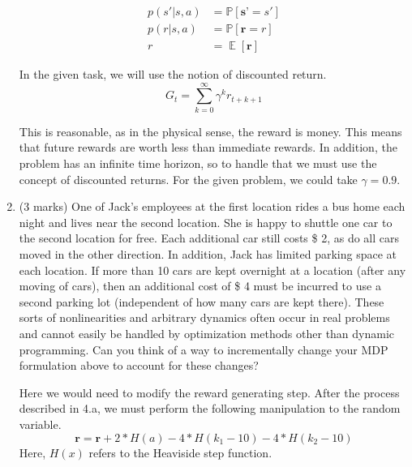 \documentclass[addpoints,12pt,solution]{exam}
\DeclareMathOperator{\E}{\mathbb{E}}
\begin{document}
\begin{questions}
\begin{enumerate}[label=(\alph*)]
\begin{solution}
                \begin{align*}
                    p(s'| s, a) &= \mathbb{P}[\textbf{s'} = s'] \\
                    p(r| s, a) &= \mathbb{P}[\textbf{r} =r ] \\
                    r &= \E[\textbf{r}]
                \end{align*}

                In the given task, we will use the notion of discounted return.
                \[
                    G_t = \sum_{k=0}^{\infty}\gamma^k r_{t+k+1}
                \]

                This is reasonable, as in the physical sense, the reward is money.
                This means that future rewards are worth less than immediate rewards.
                In addition, the problem has an infinite time horizon, so to handle that we must use the concept of discounted returns.
                For the given problem, we could take $\gamma = 0.9$.


            \end{solution}

            \item (3 marks) One of Jack’s employees at the first location rides a bus home each night and lives near the second location. She is happy to shuttle one car to the second location for free. Each additional car still costs \$ 2, as do all cars moved in the other direction. In addition, Jack has limited parking space at each location. If more than 10 cars are kept overnight at a location (after any moving of cars), then an additional cost of \$ 4 must be incurred to use a second parking lot (independent of how many cars are kept there). These sorts of nonlinearities and arbitrary dynamics often occur in real problems and cannot easily be handled by optimization methods other than
            dynamic programming. Can you think of a way to incrementally change your MDP formulation above to account for these changes?

            \begin{solution}
                Here we would need to modify the reward generating step.
                After the process described in 4.a, we must perform the following manipulation to the random variable.
                \[
                    \textbf{r} = \textbf{r} + 2 * H(a) - 4 * H(k_1 - 10) - 4 * H(k_2 - 10)
                \]
                Here, $H(x)$ refers to the Heaviside step function.
            \end{solution}


\end{enumerate}
\end{questions}
\end{document}
